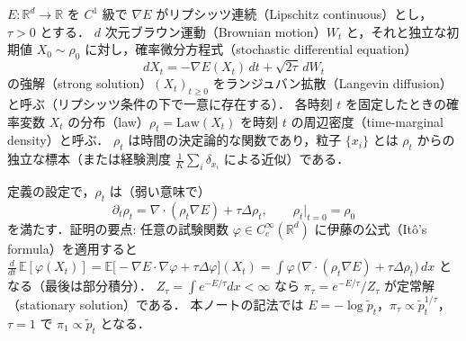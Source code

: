 \documentclass[a4paper,11pt]{article}
\newcommand{\RR}{\mathbb{R}}
\newcommand{\ptil}{\tilde p_t}
\begin{document}
{\color{red}
\begin{defi}
$E: \RR^d \to \RR$ を $C^1$ 級で $\nabla E$ がリプシッツ連続（Lipschitz continuous）とし，$\tau > 0$ とする．
$d$ 次元ブラウン運動（Brownian motion）$W_t$ と，それと独立な初期値 $X_0 \sim \rho_0$ に対し，確率微分方程式（stochastic differential equation）
\begin{equation}
  dX_t = -\nabla E(X_t)\, dt + \sqrt{2\tau}\, dW_t
  \label{eq:langevin-sde}
\end{equation}
の強解（strong solution）$(X_t)_{t \ge 0}$ をランジュバン拡散（Langevin diffusion）と呼ぶ（リプシッツ条件の下で一意に存在する）．
各時刻 $t$ を固定したときの確率変数 $X_t$ の分布（law）$\rho_t = \mathrm{Law}(X_t)$ を時刻 $t$ の周辺密度（time-marginal density）と呼ぶ．
$\rho_t$ は時間の決定論的な関数であり，粒子 $\{x_i\}$ とは $\rho_t$ からの独立な標本（または経験測度 $\frac1K \sum_i \delta_{x_i}$ による近似）である．
\end{defi}

\begin{prop}
定義の設定で，$\rho_t$ は（弱い意味で）
\begin{equation}
  \partial_t \rho_t = \nabla \cdot (\rho_t \nabla E) + \tau \Delta \rho_t, \qquad \rho_t|_{t=0} = \rho_0
  \label{eq:fokker-planck}
\end{equation}
を満たす．証明の要点: 任意の試験関数 $\varphi \in C_c^\infty(\RR^d)$ に伊藤の公式（It\^o's formula）を適用すると
$\frac{d}{dt}\, \mathbb{E}[\varphi(X_t)] = \mathbb{E}\big[-\nabla E \cdot \nabla \varphi + \tau \Delta \varphi\big](X_t)
= \int \varphi\, \big(\nabla \cdot (\rho_t \nabla E) + \tau \Delta \rho_t\big)\, dx$ となる（最後は部分積分）．
$Z_\tau = \int e^{-E/\tau} dx < \infty$ なら $\pi_\tau = e^{-E/\tau}/Z_\tau$ が定常解（stationary solution）である．
本ノートの記法では $E = -\log \ptil$，$\pi_\tau \propto \ptil^{1/\tau}$，$\tau = 1$ で $\pi_1 \propto \ptil$ となる．
\end{prop}

}
\end{document}
